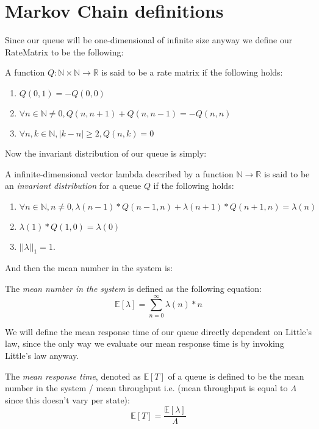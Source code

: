 \section{Markov Chain definitions}

Since our queue will be one-dimensional of infinite size anyway we define our RateMatrix to be the following:
\begin{definition}\label{def:RateMatrix}\leanok
    A function $Q \colon \mathbb{N} \times \mathbb{N} \to \mathbb{R}$ is said to be a rate matrix
    if the following holds:
    \begin{enumerate}
      \item $Q(0,1) = -Q(0,0)$
      \item $\forall n \in \mathbb{N} \neq 0, Q(n, n+1) + Q(n, n-1) = -Q(n,n)$
      \item $\forall n, k \in \mathbb{N}, |k-n| \geq 2, Q(n,k) = 0$
    \end{enumerate}
\end{definition}

Now the invariant distribution of our queue is simply:
\begin{definition}\label{def:InvariantDistribution}\leanok
    A infinite-dimensional vector lambda described by a function $\mathbb{N} \to \mathbb{R}$ is said
    to be an \textit{invariant distribution} for a queue $Q$ if the following holds:\
    \begin{enumerate}
        \item $\forall n \in \mathbb{N}, n \neq 0, \lambda(n-1) * Q(n-1,n) + \lambda(n+1) * Q(n+1,n) = \lambda(n)$
        \item $\lambda(1) * Q(1,0) = \lambda(0)$
        \item $||\lambda||_1 = 1$.
    \end{enumerate}
\end{definition}

And then the mean number in the system is:
\begin{definition}\label{def:MeanLambda}
    The \textit{mean number in the system} is defined as the following equation:
    $$\mathbb{E}[\lambda] = \sum_{n=0}^\infty \lambda(n)*n$$
\end{definition}

We will define the mean response time of our queue directly dependent on Little's law, since the only
way we evaluate our mean response time is by invoking Little's law anyway.
\begin{definition}\label{def:MeanResponseTime}\uses{def:MeanLambda}\leanok
    The \textit{mean response time}, denoted as $\mathbb{E}[T]$ of a queue is defined to be the mean
    number in the system / mean throughput i.e. (mean throughput is equal to $\Lambda$ since this doesn't vary
    per state):
    $$\mathbb{E}[T] = \frac{\mathbb{E}[\lambda]}{\Lambda}$$
\end{definition}

